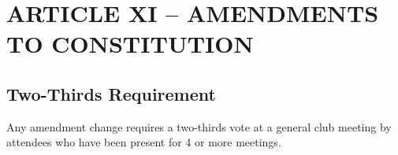 \documentclass[11pt]{amsart}
\begin{document}
\section{ARTICLE XI – AMENDMENTS TO CONSTITUTION}
\subsection{Two-Thirds Requirement}
Any amendment change requires a two-thirds vote at a general club meeting by attendees who have been present for 4 or more meetings.

\end{document}
